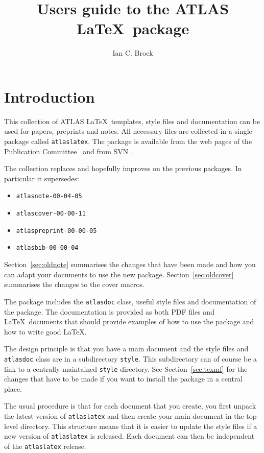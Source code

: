 \documentclass[koma,UKenglish]{style/atlasdoc}
\title{Users guide to the ATLAS \LaTeX\ package}
\author{Ian C. Brock}
\affil{University of Bonn}
\begin{document}
\tableofcontents
\clearpage

\section{Introduction}
\label{sec:intro}

This collection of ATLAS \LaTeX\ templates, style files and documentation
can be used for papers, preprints and notes. 
All necessary files are collected in a single package called \texttt{atlaslatex}.
The package is available from the web pages of the Publication Committee~\cite{pubcom} and from 
SVN~\cite{pubcom-svn}.

The collection replaces and hopefully improves on the previous packages. 
In particular it supersedes:
\begin{itemize}\setlength{\parskip}{0pt}\setlength{\itemsep}{0pt}
\item \texttt{atlasnote-00-04-05}
\item \texttt{atlascover-00-00-11}
\item \texttt{atlaspreprint-00-00-05}
\item \texttt{atlasbib-00-00-04}
\end{itemize}
Section~\ref{sec:oldnote} summarises the changes that have been made and
how you can adapt your documents to use the new package.
Section~\ref{sec:oldcover} summarises the changes to the cover macros.

The package includes the \texttt{atlasdoc} class, useful style files
and documentation of the package.
The documentation is provided as both PDF files and \LaTeX\ documents
that should provide examples of how to use the package and how to write
good \LaTeX.

The design principle is that you have a main document and 
the style files and \texttt{atlasdoc} class are in a subdirectory \texttt{style}.
This subdirectory can of course be a link to a centrally maintained \texttt{style} directory.
See Section~\ref{sec:texmf} for the changes that have to be made if you want to install
the package in a central place.

The usual procedure is that for each document that you create,
you first unpack the latest version of \texttt{atlaslatex} and
then create your main document in the top-level directory.
This structure means that it is easier to update the style files if a new version of
\texttt{atlaslatex} is released. 
Each document can then be independent of the \texttt{atlaslatex} release.
\end{document}
